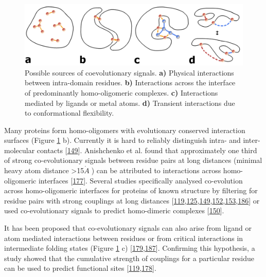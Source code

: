 \documentclass[11pt,a4paper,twoside]{book}
\newcommand{\angstrom}{\mathring{A} \;}
\theoremstyle{definition}
\theoremstyle{definition}
\theoremstyle{remark}
\begin{document}
\begin{figure}

{\centering \includegraphics[width=0.9\linewidth]{img/intro/sources_of_coevolution} 

}

\caption{Possible sources of coevolutionary
signals. \textbf{a)} Physical interactions between intra-domain
residues. \textbf{b)} Interactions across the interface of predominantly
homo-oligomeric complexes. \textbf{c)} Interactions mediated by ligands
or metal atoms. \textbf{d)} Transient interactions due to conformational
flexibility.}\label{fig:sources-coevolution}
\end{figure}

Many proteins form homo-oligomers with evolutionary conserved
interaction surfaces (Figure \ref{fig:sources-coevolution} b). Currently
it is hard to reliably distinguish intra- and inter-molecular contacts
{[}\protect\hyperlink{ref-Uguzzoni2017}{149}{]}. Anishchenko et al.
found that approximately one third of strong co-evolutionary signals
between residue pairs at long distances (minimal heavy atom distance
\textgreater{}15\(\angstrom\)) can be attributed to interactions across
homo-oligomeric interfaces
{[}\protect\hyperlink{ref-Anishchenko2017}{177}{]}. Several studies
specifically analysed co-evolution across homo-oligomeric interfaces for
proteins of known structure by filtering for residue pairs with strong
couplings at long distances
{[}\protect\hyperlink{ref-Hopf2012}{119},\protect\hyperlink{ref-Wang2015}{125},\protect\hyperlink{ref-Uguzzoni2017}{149},\protect\hyperlink{ref-Sutto2015}{152},\protect\hyperlink{ref-Jana2014}{153},\protect\hyperlink{ref-Lee2009}{186}{]}
or used co-evolutionary signals to predict homo-dimeric complexes
{[}\protect\hyperlink{ref-DosSantos2015a}{150}{]}.

It has been proposed that co-evolutionary signals can also arise from
ligand or atom mediated interactions between residues or from critical
interactions in intermediate folding states (Figure
\ref{fig:sources-coevolution} c)
{[}\protect\hyperlink{ref-Buslje2009}{179},\protect\hyperlink{ref-Ovchinnikov2015b}{187}{]}.
Confirming this hypothesis, a study showed that the cumulative strength
of couplings for a particular residue can be used to predict functional
sites
{[}\protect\hyperlink{ref-Hopf2012}{119},\protect\hyperlink{ref-Marks2012}{178}{]}.
\end{document}
